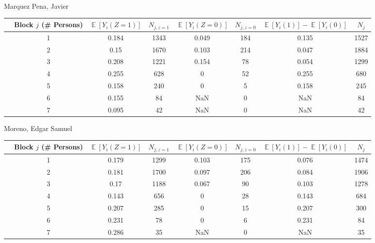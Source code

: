 \documentclass[11pt,notitlepage]{article}
\def\E{\mathop{\mathbb{E}}}
\begin{document}
Marquez Pena, Javier


\begin{table}[h!]\small
\begin{center}
\begin{tabular}{rc|cc|cc|cc}
  \hline
 & Block $j$ (\# Persons) & $\E[Y_i(Z=1)]$ & $N_{j, z=1}$ & $\E[Y_i(Z=0)]$ & $N_{j, z=0}$ & $\E[Y_i(1)]-\E[Y_i(0)]$ & $N_j$ \\ 
  \hline
 & 1 & 0.184 & 1343 & 0.049 & 184 & 0.135 & 1527 \\ 
 & 2 & 0.15 & 1670 & 0.103 & 214 & 0.047 & 1884 \\ 
 & 3 & 0.208 & 1221 & 0.154 & 78 & 0.054 & 1299 \\ 
 & 4 & 0.255 & 628 & 0 & 52 & 0.255 & 680 \\ 
 & 5 & 0.158 & 240 & 0 & 5 & 0.158 & 245 \\ 
 & 6 & 0.155 & 84 & NaN & 0 & NaN & 84 \\ 
 & 7 & 0.095 & 42 & NaN & 0 & NaN & 42 \\ 
   \hline
\end{tabular}
\end{center}
\end{table}


Moreno, Edgar Samuel


\begin{table}[h!]\small
\begin{center}
\begin{tabular}{rc|cc|cc|cc}
  \hline
 & Block $j$ (\# Persons) & $\E[Y_i(Z=1)]$ & $N_{j, z=1}$ & $\E[Y_i(Z=0)]$ & $N_{j, z=0}$ & $\E[Y_i(1)]-\E[Y_i(0)]$ & $N_j$ \\ 
  \hline
  & 1 & 0.179 & 1299 & 0.103 & 175 & 0.076 & 1474 \\ 
  & 2 & 0.181 & 1700 & 0.097 & 206 & 0.084 & 1906 \\ 
  & 3 & 0.17 & 1188 & 0.067 & 90 & 0.103 & 1278 \\ 
  & 4 & 0.143 & 656 & 0 & 28 & 0.143 & 684 \\ 
  & 5 & 0.207 & 285 & 0 & 15 & 0.207 & 300 \\ 
  & 6 & 0.231 & 78 & 0 & 6 & 0.231 & 84 \\ 
  & 7 & 0.286 & 35 & NaN & 0 & NaN & 35 \\ 
   \hline
\end{tabular}
\end{center}
\end{table}
\end{document}
